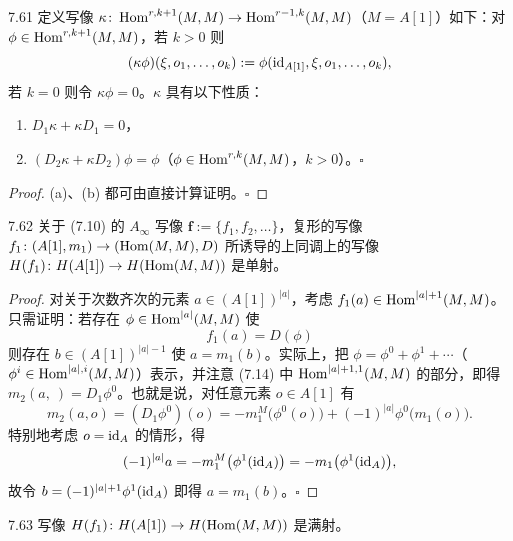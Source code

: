 \begin{proposition}{7.61}
定义写像 $\kappa\colon\operatorname{Hom}^{r,k+1}(M,M)\to\operatorname{Hom}^{r-1,k}(M,M)$（$M=A[1]$）如下：对 $\phi\in\operatorname{Hom}^{r,k+1}(M,M)$，若 $k>0$ 则
\[
  (\kappa\phi)(\xi,o_{1},\dots,o_{k}):=\phi(\mathrm{id}_{A[1]},\xi,o_{1},\dots,o_{k}),
\]
若 $k=0$ 则令 $\kappa\phi=0$。$\kappa$ 具有以下性质：
\begin{enumerate}[label=(\alph*),leftmargin=2em,itemsep=1pt,topsep=2pt]
  \item $D_{1}\kappa+\kappa D_{1}=0$，
  \item $(D_{2}\kappa+\kappa D_{2})\phi=\phi$\quad（$\phi\in\operatorname{Hom}^{r,k}(M,M)$，$k>0$）。\hfill$\square$
\end{enumerate}
\end{proposition}

\begin{proof}
(a)、(b) 都可由直接计算证明。\hfill$\square$
\end{proof}

\begin{proposition}{7.62}
关于 (7.10) 的 $A_\infty$ 写像 $\mathbf f:=\{f_{1},f_{2},\dots\}$，复形的写像 $f_{1}\colon(A[1],m_{1})\to(\operatorname{Hom}(M,M),D)$ 所诱导的上同调上的写像 $H(f_{1})\colon H(A[1])\to H(\operatorname{Hom}(M,M))$ 是单射。
\end{proposition}

\begin{proof}
对关于次数齐次的元素 $a\in(A[1])^{|a|}$，考虑 $f_{1}(a)\in\operatorname{Hom}^{|a|+1}(M,M)$。只需证明：若存在 $\phi\in\operatorname{Hom}^{|a|}(M,M)$ 使
\begin{equation}
  f_{1}(a)=D(\phi) \tag{7.14}
\end{equation}
则存在 $b\in(A[1])^{|a|-1}$ 使 $a=m_{1}(b)$。实际上，把 $\phi=\phi^{0}+\phi^{1}+\cdots$（$\phi^{i}\in\operatorname{Hom}^{|a|,i}(M,M)$）表示，并注意 (7.14) 中 $\operatorname{Hom}^{|a|+1,1}(M,M)$ 的部分，即得 $m_{2}(a,\ )=D_{1}\phi^{0}$。也就是说，对任意元素 $o\in A[1]$ 有
\[
  m_{2}(a,o)=(D_{1}\phi^{0})(o)=-m_{1}^{M}\bigl(\phi^{0}(o)\bigr)+(-1)^{|a|}\phi^{0}\bigl(m_{1}(o)\bigr).
\]
特别地考虑 $o=\mathrm{id}_{A}$ 的情形，得
\[
  (-1)^{|a|}a=-m_{1}^{M}\bigl(\phi^{1}(\mathrm{id}_{A})\bigr)=-m_{1}\bigl(\phi^{1}(\mathrm{id}_{A})\bigr),
\]
故令 $b=(-1)^{|a|+1}\phi^{1}(\mathrm{id}_{A})$ 即得 $a=m_{1}(b)$。\hfill$\square$
\end{proof}

\begin{proposition}{7.63}
写像 $H(f_{1})\colon H(A[1])\to H(\operatorname{Hom}(M,M))$ 是满射。
\end{proposition}

